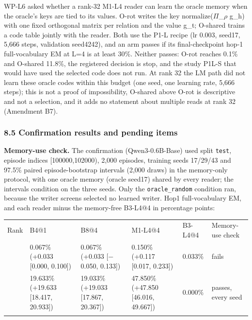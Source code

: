 WP-L6 asked whether a rank-32 M1-L4 reader can learn the oracle memory when the oracle’s keys are
tied to its values. O-rot writes the key normalize(\ensuremath{\Pi}\_\ensuremath{\rho} g\_h) with one fixed orthogonal matrix per
relation and the value g\_t; O-shared trains a code table jointly with the reader. Both use the
P1-L recipe (lr 0.003, seed17, 5,666 steps, validation seed4242), and an arm passes if its
final-checkpoint hop-1 full-vocabulary EM at L=4 is at least 30\%. Neither passes:  %
O-rot reaches 0.1\% and O-shared 11.8\%, the registered decision is stop, and the study P1L-S that
would have used the selected code does not run. At rank 32 the LM path did not learn  %
these oracle codes within this budget (one seed, one learning rate, 5,666 steps); this is not a
proof of impossibility, O-shared above O-rot is descriptive and not a selection, and it adds no
statement about multiple reads at rank 32 (Amendment B7).  %

\subsubsection*{8.5 Confirmation results and pending items}

\textbf{Memory-use check.} The confirmation (Qwen3-0.6B-Base) used split \texttt{test}, episode indices [100000,102000), 2,000 episodes, training seeds
17/\allowbreak{}29/\allowbreak{}43 and 97.5\% paired episode-bootstrap intervals (2,000 draws) in the memory-only protocol, with one oracle memory
(oracle seed17) shared by every reader; the intervals condition on the three seeds. Only the \texttt{oracle\_random} condition ran,
because the writer screens selected no learned writer. Hop1 full-vocabulary EM, and each reader minus the memory-free
B3-L4@4 in percentage points:


{\footnotesize
\setlength{\tabcolsep}{3pt}
\begin{longtable}{W{113}{12}W{213}{12}W{216}{12}W{223}{12}W{113}{12}W{122}{12}}
\toprule
Rank & B4@1 & B8@4 & M1-L4@4 & B3-L4@4 & Memory-use check \\ \addlinespace[3pt]
\midrule {} & 0.067\% (+0.033 [0.000, 0.100]) & 0.067\% (+0.033 [\ensuremath{-}0.050, 0.133]) & 0.150\% (+0.117 [0.017, 0.233]) & 0.033\% & fails \\  & 19.633\% (+19.633 [18.417, 20.933]) & 19.033\% (+19.033 [17.867, 20.367]) & 47.850\% (+47.850 [46.016, 49.667]) & 0.000\% & passes, every seed \\ \addlinespace[3pt]
\bottomrule
\end{longtable}
}


